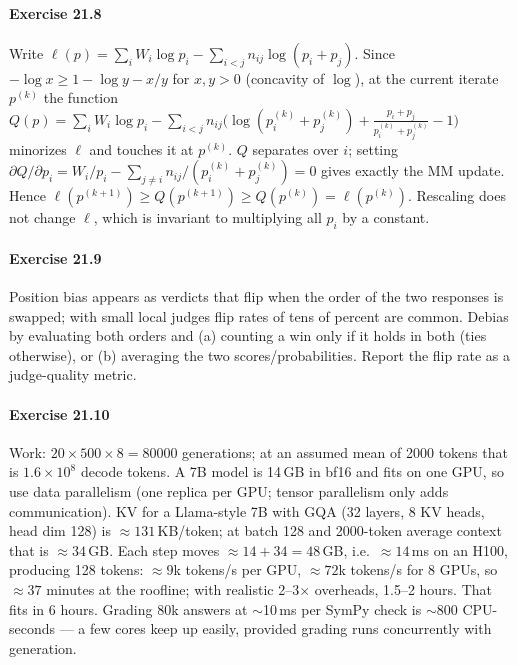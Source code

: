 \paragraph{Exercise 21.8} Write $\ell(p) = \sum_i W_i \log p_i - \sum_{i<j} n_{ij}\log(p_i+p_j)$.
Since $-\log x \ge 1 - \log y - x/y$ for $x, y > 0$ (concavity of $\log$), at the current iterate
$p^{(k)}$ the function
$Q(p) = \sum_i W_i\log p_i - \sum_{i<j} n_{ij}\bigl(\log(p^{(k)}_i+p^{(k)}_j) + \frac{p_i+p_j}{p^{(k)}_i+p^{(k)}_j} - 1\bigr)$
minorizes $\ell$ and touches it at $p^{(k)}$. $Q$ separates over $i$; setting
$\partial Q/\partial p_i = W_i/p_i - \sum_{j\ne i} n_{ij}/(p^{(k)}_i+p^{(k)}_j) = 0$ gives exactly the
MM update. Hence $\ell(p^{(k+1)}) \ge Q(p^{(k+1)}) \ge Q(p^{(k)}) = \ell(p^{(k)})$. Rescaling
does not change $\ell$, which is invariant to multiplying all $p_i$ by a constant.

\paragraph{Exercise 21.9} Position bias appears as verdicts that flip when the order of the two
responses is swapped; with small local judges flip rates of tens of percent are common. Debias by
evaluating both orders and (a) counting a win only if it holds in both (ties otherwise), or (b)
averaging the two scores/probabilities. Report the flip rate as a judge-quality metric.

\paragraph{Exercise 21.10} Work: $20 \times 500 \times 8 = \num{80000}$ generations; at an assumed
mean of 2000 tokens that is $1.6\times10^8$ decode tokens. A 7B model is 14\,GB in bf16 and fits on
one GPU, so use data parallelism (one replica per GPU; tensor parallelism only adds communication).
KV for a Llama-style 7B with GQA (32 layers, 8 KV heads, head dim 128) is $\approx 131$\,KB/token; at
batch 128 and 2000-token average context that is $\approx 34$\,GB. Each step moves
$\approx 14 + 34 = 48$\,GB, i.e.\ $\approx 14$\,ms on an H100, producing 128 tokens: $\approx 9$k
tokens/s per GPU, $\approx 72$k tokens/s for 8 GPUs, so $\approx 37$ minutes at the roofline; with
realistic 2--3$\times$ overheads, 1.5--2 hours. That fits in 6 hours. Grading 80k answers at
$\sim$10\,ms per SymPy check is $\sim$800 CPU-seconds --- a few cores keep up easily, provided
grading runs concurrently with generation.

